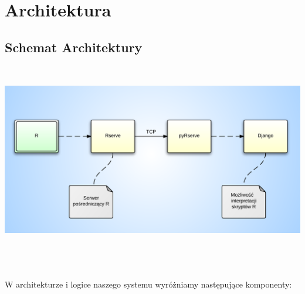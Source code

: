 \documentclass[licencjacka]{pracamgr}
\begin{document}
 \chapter{Architektura} 
\section{Schemat Architektury}
~\\
\begin{minipage}{\linewidth} 
	\centering
           \includegraphics{architekturaR.png}
\end{minipage} \\ \\ \\
 W architekturze i logice naszego systemu wyróżniamy następujące komponenty:
\end{document}
